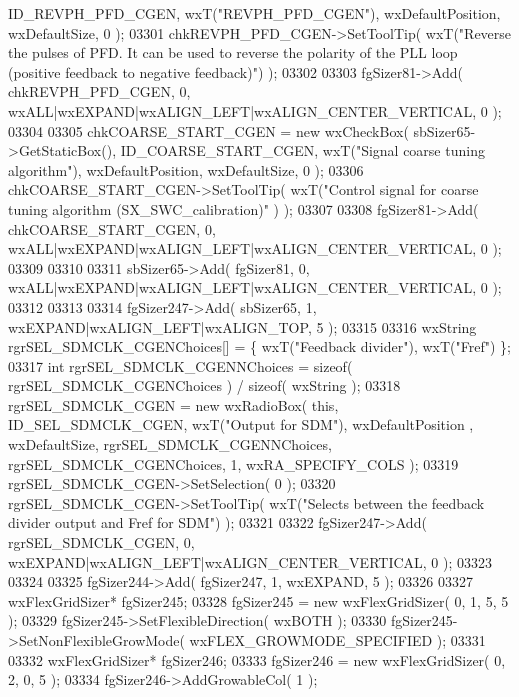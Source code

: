 \begin{DoxyCode}
      ID_REVPH_PFD_CGEN, wxT(\textcolor{stringliteral}{"REVPH\_PFD\_CGEN"}), wxDefaultPosition, wxDefaultSize, 0 );
03301     chkREVPH_PFD_CGEN->SetToolTip( wxT(\textcolor{stringliteral}{"Reverse the pulses of PFD. It can be used to reverse the polarity
       of the PLL loop (positive feedback to negative feedback)"}) );
03302     
03303     fgSizer81->Add( chkREVPH_PFD_CGEN, 0, wxALL|wxEXPAND|wxALIGN\_LEFT|wxALIGN\_CENTER\_VERTICAL, 0 );
03304     
03305     chkCOARSE_START_CGEN = \textcolor{keyword}{new} wxCheckBox( sbSizer65->GetStaticBox(), 
      ID_COARSE_START_CGEN, wxT(\textcolor{stringliteral}{"Signal coarse tuning algorithm"}), wxDefaultPosition, wxDefaultSize, 0 );
03306     chkCOARSE_START_CGEN->SetToolTip( wxT(\textcolor{stringliteral}{"Control signal for coarse tuning algorithm (SX\_SWC\_calibration)"}
      ) );
03307     
03308     fgSizer81->Add( chkCOARSE_START_CGEN, 0, wxALL|wxEXPAND|wxALIGN\_LEFT|wxALIGN\_CENTER\_VERTICAL, 0 );
03309     
03310     
03311     sbSizer65->Add( fgSizer81, 0, wxALL|wxEXPAND|wxALIGN\_LEFT|wxALIGN\_CENTER\_VERTICAL, 0 );
03312     
03313     
03314     fgSizer247->Add( sbSizer65, 1, wxEXPAND|wxALIGN\_LEFT|wxALIGN\_TOP, 5 );
03315     
03316     wxString rgrSEL\_SDMCLK\_CGENChoices[] = \{ wxT(\textcolor{stringliteral}{"Feedback divider"}), wxT(\textcolor{stringliteral}{"Fref"}) \};
03317     \textcolor{keywordtype}{int} rgrSEL\_SDMCLK\_CGENNChoices = \textcolor{keyword}{sizeof}( rgrSEL\_SDMCLK\_CGENChoices ) / \textcolor{keyword}{sizeof}( wxString );
03318     rgrSEL_SDMCLK_CGEN = \textcolor{keyword}{new} wxRadioBox( \textcolor{keyword}{this}, ID_SEL_SDMCLK_CGEN, wxT(\textcolor{stringliteral}{"Output for SDM"}), wxDefaultPosition
      , wxDefaultSize, rgrSEL\_SDMCLK\_CGENNChoices, rgrSEL\_SDMCLK\_CGENChoices, 1, wxRA\_SPECIFY\_COLS );
03319     rgrSEL_SDMCLK_CGEN->SetSelection( 0 );
03320     rgrSEL_SDMCLK_CGEN->SetToolTip( wxT(\textcolor{stringliteral}{"Selects between the feedback divider output and Fref for SDM"}) );
03321     
03322     fgSizer247->Add( rgrSEL_SDMCLK_CGEN, 0, wxEXPAND|wxALIGN\_LEFT|wxALIGN\_CENTER\_VERTICAL, 0 );
03323     
03324     
03325     fgSizer244->Add( fgSizer247, 1, wxEXPAND, 5 );
03326     
03327     wxFlexGridSizer* fgSizer245;
03328     fgSizer245 = \textcolor{keyword}{new} wxFlexGridSizer( 0, 1, 5, 5 );
03329     fgSizer245->SetFlexibleDirection( wxBOTH );
03330     fgSizer245->SetNonFlexibleGrowMode( wxFLEX\_GROWMODE\_SPECIFIED );
03331     
03332     wxFlexGridSizer* fgSizer246;
03333     fgSizer246 = \textcolor{keyword}{new} wxFlexGridSizer( 0, 2, 0, 5 );
03334     fgSizer246->AddGrowableCol( 1 );

\end{DoxyCode}

